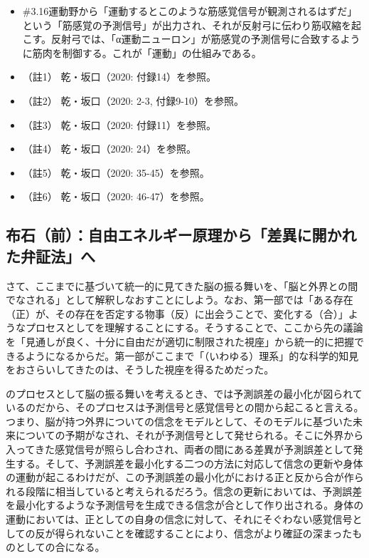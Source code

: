 \begin{note}{}
  \begin{itemize}
    \tightlist
    \item{\#3.16}運動野から「運動するとこのような筋感覚信号が観測されるはずだ」という「筋感覚の予測信号」が出力され、それが反射弓に伝わり筋収縮を起こす。反射弓では、「α運動ニューロン」が筋感覚の予測信号に合致するように筋肉を制御する。これが「運動」の仕組みである。
  \end{itemize}
\end{note}

\begin{itemize}
\tightlist
\item
  （註1） 乾・坂口（2020: 付録14）\cite{InuiAndSakaguchi}を参照。
\item
  （註2） 乾・坂口（2020: 2-3, 付録9-10）\cite{InuiAndSakaguchi}を参照。
\item
  （註3） 乾・坂口（2020: 付録11）\cite{InuiAndSakaguchi}を参照。
\item
  （註4） 乾・坂口（2020: 24）\cite{InuiAndSakaguchi}を参照。
\item
  （註5） 乾・坂口（2020: 35-45）\cite{InuiAndSakaguchi}を参照。
\item
  （註6） 乾・坂口（2020: 46-47）\cite{InuiAndSakaguchi}を参照。
\end{itemize}

\subsection{布石（前）：自由エネルギー原理から「差異に開かれた弁証法」へ}\label{ux5e03ux77f3ux524dux81eaux7531ux30a8ux30cdux30ebux30aeux30fcux539fux7406ux304bux3089ux5deeux7570ux306bux958bux304bux308cux305fux5f01ux8a3cux6cd5ux3078}

さて、ここまでに基づいて統一的に見てきた脳の振る舞いを、「脳と外界との間でなされる」として解釈しなおすことにしよう。なお、第一部では「ある存在（正）が、その存在を否定する物事（反）に出会うことで、変化する（合）」ようなプロセスとしてを理解することにする。そうすることで、ここから先の議論を「見通しが良く、十分に自由だが適切に制限された視座」から統一的に把握できるようになるからだ。第一部がここまで「（いわゆる）理系」的な科学的知見をおさらいしてきたのは、そうした視座を得るためだった。

のプロセスとして脳の振る舞いを考えるとき、では予測誤差の最小化が図られているのだから、そのプロセスは予測信号と感覚信号との間から起こると言える。つまり、脳が持つ外界についての信念をモデルとして、そのモデルに基づいた未来についての予期がなされ、それが予測信号として発せられる。そこに外界から入ってきた感覚信号が照らし合わされ、両者の間にある差異が予測誤差として発生する。そして、予測誤差を最小化する二つの方法に対応して信念の更新や身体の運動が起こるわけだが、この予測誤差の最小化がにおける正と反から合が作られる段階に相当していると考えられるだろう。信念の更新においては、予測誤差を最小化するような予測信号を生成できる信念が合として作り出される。身体の運動においては、正としての自身の信念に対して、それにそぐわない感覚信号としての反が得られないことを確認することにより、信念がより確証の深まったものとしての合になる。

